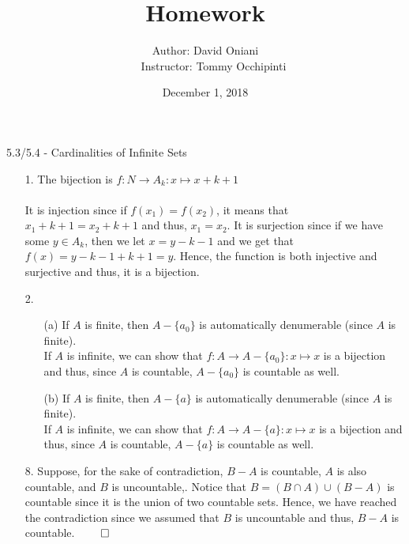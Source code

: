 \documentclass[12pt, a4paper]{article}
\title{\bf{Homework \textnumero 14}}
\author{Author: David Oniani
\\
\ \ \ Instructor: Tommy Occhipinti}
\date{December 1, 2018}
\newcommand\und[1]{\underline{\smash{#1}}}
\newcommand{\rarr}{\rightarrow}
\begin{document}
\maketitle
{\Large 5.3/5.4 - Cardinalities of Infinite Sets}
\begin{itemize}
\item[]
\item[]
{\und{\large Section 5.3}}
\item[1.]
The bijection is $f : N \rarr A_k : x \mapsto x + k + 1$ \\\\
It is injection since if $f(x_1) = f(x_2)$, it means that $x_1 + k + 1 = x_2 + k + 1$ and thus, $x_1 = x_2$.
It is surjection since if we have some $y \in A_k$, then we let $x = y - k - 1$ and we get that $f(x) = y - k - 1 + k + 1 = y$.
Hence, the function is both injective and surjective and thus, it is a bijection.

\item[2.]
\begin{itemize}
\item[(a)]
If $A$ is finite, then $A - \{a_0\}$ is automatically denumerable (since $A$ is finite).\\
If $A$ is infinite, we can show that $f : A \rarr A - \{a_0\} : x \mapsto x$ is a bijection and thus, since
$A$ is countable, $A - \{a_0\}$ is countable as well.
\item[(b)]
If $A$ is finite, then $A - \{a\}$ is automatically denumerable (since $A$ is finite).\\
If $A$ is infinite, we can show that $f : A \rarr A - \{a\} : x \mapsto x$ is a bijection and thus, since
$A$ is countable, $A - \{a\}$ is countable as well.
\end{itemize}

\item[]

\item[8.]
Suppose, for the sake of contradiction, $B - A$ is countable, $A$ is also countable, and $B$ is uncountable,.
Notice that $B = (B \cap A) \cup (B - A)$ is countable since it is the union of two countable sets.
Hence, we have reached the contradiction since we assumed that $B$ is uncountable and thus, $B - A$ is countable.
$\qed$

\item[]


\end{itemize}
\end{document}
